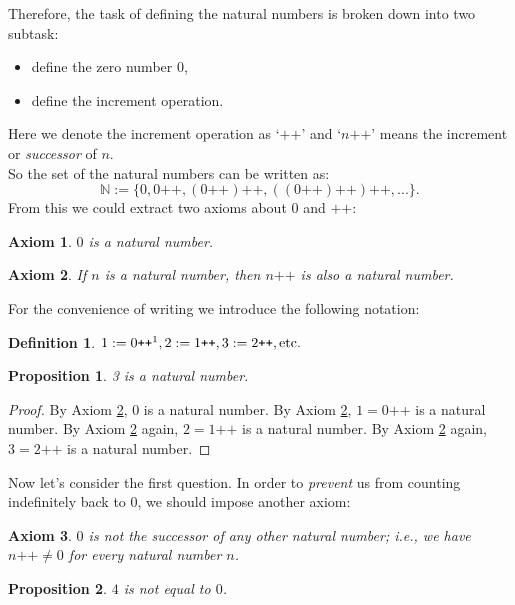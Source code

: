 \documentclass[a4paper]{book}
\newtheorem*{proof}{\textit{Proof.}}
\theoremstyle{break}
\newtheorem{definition}{Definition}[section]
\newtheorem{axiom}{Axiom}[chapter]
\newtheorem{proposition}{Proposition}[section]
\begin{document}
			Therefore, the task of defining the natural numbers is broken down into two subtask:
			\begin{itemize}
				\item define the zero number $0$,
				\item define the increment operation.
			\end{itemize}
			Here we denote the increment operation as `$\texttt{++}$' and `$n\texttt{++}$' means the increment or \textit{successor} of $n$.\\
			So the set of the natural numbers can be written as:
			\begin{equation*}
				\mathbb{N} := \{0,0\texttt{++},(0\texttt{++})\texttt{++},((0\texttt{++})\texttt{++})\texttt{++},...\}.
			\end{equation*}
			From this we could extract two axioms about $0$ and $\texttt{++}$:
			\begin{axiom}
				\label{ax:peano1}
				$0$ is a natural number.
			\end{axiom}
			\begin{axiom}
				\label{ax:peano2}
				If $n$ is a natural number, then $n\texttt{++}$ is also a natural number.
			\end{axiom}
			For the convenience of writing we introduce the following notation:
			\begin{definition}
				$1 :=0\texttt{++}\footnotemark, 2 :=1\texttt{++}, 3 :=2\texttt{++}, \mathrm{etc.}$ 
			\end{definition}
			\begin{proposition}
				3 is a natural number.
			\end{proposition}
			\begin{proof}
				By Axiom \ref{ax:peano2}, $0$ is a natural number. By Axiom \ref{ax:peano2}, $1 = 0\texttt{++}$ is a natural number. By Axiom \ref{ax:peano2} again, $2 = 1\texttt{++}$ is a natural number. By Axiom \ref{ax:peano2} again, $3 = 2\texttt{++}$ is a natural number.
			\end{proof}
			Now let's consider the first question. In order to \textit{prevent} us from counting indefinitely back to $0$, we should impose another axiom:
			\begin{axiom}
				\label{ax:peano3}
				$0$ is not the successor of any other natural number; i.e., we have $n\texttt{++} \neq 0$ for every natural number $n$.
			\end{axiom}
			\begin{proposition}
				\label{pro:4<>0}
				$4$ is not equal to $0$.
			\end{proposition}
\end{document}
